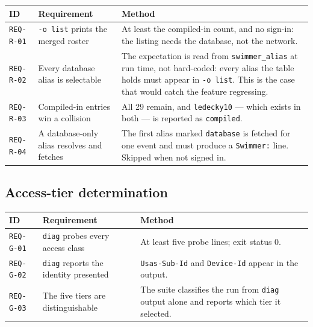 \documentclass[12pt]{article}
\newcommand{\code}[1]{\texttt{#1}}
\newcommand{\req}[1]{\texttt{#1}}
\begin{document}
\begin{center}
\begin{longtable}{p{2.1cm}p{5.2cm}p{6.2cm}}
  \toprule
  \textbf{ID} & \textbf{Requirement} & \textbf{Method} \\
  \midrule\endhead
  \req{REQ-R-01} & \code{-o list} prints the merged roster
    & At least the compiled-in count, and no sign-in: the listing needs
      the database, not the network. \\
  \req{REQ-R-02} & Every database alias is selectable
    & The expectation is read from \code{swimmer\_alias} at run time,
      not hard-coded: every alias the table holds must appear in
      \code{-o list}.  This is the case that would catch the feature
      regressing. \\
  \req{REQ-R-03} & Compiled-in entries win a collision
    & All 29 remain, and \code{ledecky10} --- which exists in both ---
      is reported as \code{compiled}. \\
  \req{REQ-R-04} & A database-only alias resolves and fetches
    & The first alias marked \code{database} is fetched for one event
      and must produce a \code{Swimmer:} line.  Skipped when not signed
      in. \\
  \bottomrule
\end{longtable}
\end{center}

\subsection{Access-tier determination}

\begin{center}
\begin{longtable}{p{2.1cm}p{5.2cm}p{6.2cm}}
  \toprule
  \textbf{ID} & \textbf{Requirement} & \textbf{Method} \\
  \midrule\endhead
  \req{REQ-G-01} & \code{diag} probes every access class
    & At least five probe lines; exit status 0. \\
  \req{REQ-G-02} & \code{diag} reports the identity presented
    & \code{Usas-Sub-Id} and \code{Device-Id} appear in the output. \\
  \req{REQ-G-03} & The five tiers are distinguishable
    & The suite classifies the run from \code{diag} output alone and
      reports which tier it selected. \\
  \bottomrule
\end{longtable}
\end{center}
\end{document}

